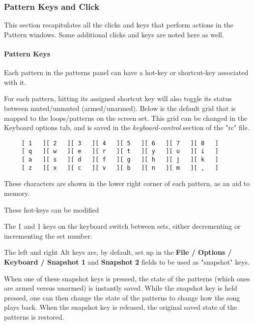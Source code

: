 \subsubsection{Pattern Keys and Click}
\label{subsubsec:seq64_patterns_pattern_keys_and_clicks}

   This section recapitulates all the clicks and keys that perform actions
   in the Pattern windows.  Some additional clicks and keys are noted here
   as well.

\paragraph{Pattern Keys}
\label{paragraph:seq64_patterns_pattern_keys}

   Each pattern in the patterns panel can have a hot-key or shortcut-key
   associated with it.

   For each pattern, hitting its assigned shortcut key will
   also toggle its status between muted/unmuted (armed/unarmed).
   Below is the default grid that is
   mapped to the loops/patterns on the screen set.
   This grid can be changed in the Keyboard options tab, and is
   saved in the \textsl{keyboard-control} section of the
   "rc" file.

   \begin{verbatim}
     [ 1   ][ 2   ][ 3   ][ 4   ][ 5   ][ 6   ][ 7   ][ 8   ]
     [ q   ][ w   ][ e   ][ r   ][ t   ][ y   ][ u   ][ i   ]
     [ a   ][ s   ][ d   ][ f   ][ g   ][ h   ][ j   ][ k   ]
     [ z   ][ x   ][ c   ][ v   ][ b   ][ n   ][ m   ][ ,   ]
   \end{verbatim}

   These characters are shown in the lower right corner of each
   pattern, as an aid to memory.

   These hot-keys can be modified

   \index{keys![}
   The \texttt{[} and
   \index{keys!]}
   \texttt{]} keys on the keyboard
   switch between sets, either decrementing or incrementing the set number.

   The left and right Alt keys are, by default, set up in the
   \textbf{File / Options / Keyboard / Snapshot 1} and
   \textbf{Snapshot 2} fields to be used as "snapshot" keys.

   When one of these snapshot keys is pressed, the state of the patterns
   (which ones are armed versus unarmed) is instantly saved.  While the
   snapshot key is held pressed, one can then change the state of the patterns
   to change how the song plays back.  When the snapshot key is released, the
   original saved state of the patterns is restored.

